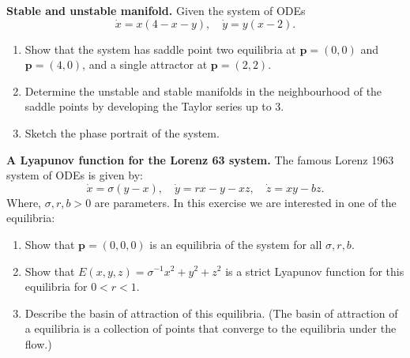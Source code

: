 \documentclass{article}
\begin{document}
\begin{question} \textbf{Stable and unstable manifold.} Given the system of ODEs
\begin{equation}
  \dot x = x(4-x-y), \quad \dot y = y(x-2).
\end{equation}
\begin{enumerate}[label=(\alph*)]
  \item Show that the system has saddle point two equilibria at $\bm p=(0,0)$ and $\bm p = (4,0)$, and a single attractor at $\bm p=(2,2)$.
  \item Determine the unstable and stable manifolds in the neighbourhood of the saddle points by developing the Taylor series up to $3$.
  
  \item Sketch the phase portrait of the system.
\end{enumerate}

\end{question}

\begin{question} \textbf{A Lyapunov function for the Lorenz 63 system.} The famous Lorenz 1963 system of ODEs is given by:
\begin{equation}
  \dot x = \sigma (y-x), \quad \dot y = r x - y - xz,\quad \dot z = xy-b z.
\end{equation}
Where, $\sigma,r,b>0$ are parameters. In this exercise we are interested in one of the equilibria:
\begin{enumerate}[label=(\alph*)]
  \item Show that $\bm p =(0,0,0)$ is an equilibria of the system for all $\sigma,r,b$.
  \item Show that $E(x,y,z)=\sigma^{-1}x^2+y^2+z^2$ is a strict Lyapunov function for this equilibria for $0< r < 1$.
  \item Describe the basin of attraction of this equilibria. (The basin of attraction of a equilibria is a collection of points that converge to the equilibria under the flow.)
\end{enumerate}
\end{question}
\end{document}
